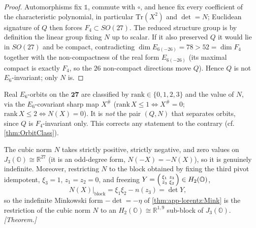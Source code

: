 \begin{proof}
Automorphisms fix $\mathbb{1}$, commute with $\circ$, and hence fix every
coefficient of the characteristic polynomial, in particular $\mathrm{Tr}(X^{2})$ and
$\det=N$; Euclidean signature of $Q$ then forces $F_{4}\subset SO(27)$. The reduced
structure group is by definition the linear group fixing $N$ up to scalar. If it also
preserved $Q$ it would lie in $SO(27)$ and be compact, contradicting
$\dim E_{6(-26)}=78>52=\dim F_{4}$ together with the non-compactness of the real form
$E_{6(-26)}$ (its maximal compact is exactly $F_{4}$, so the $26$ non-compact
directions move $Q$). Hence $Q$ is not $E_{6}$-invariant; only $N$ is.
\end{proof}

\begin{remark}
\label{rmk:app-lorentz:orbits}
Real $E_{6}$-orbits on the $\mathbf{27}$ are classified by
$\mathrm{rank}\in\{0,1,2,3\}$ and the value of $N$, via the $E_{6}$-covariant
sharp map $X^{\#}$ ($\mathrm{rank}\,X\le1\Leftrightarrow X^{\#}=0$;
$\mathrm{rank}\,X\le2\Leftrightarrow N(X)=0$). It is \emph{not} the pair $(Q,N)$
that separates orbits, since $Q$ is $F_{4}$-invariant only. This corrects any
statement to the contrary (cf. \autoref{thm:OrbitClass}).
\end{remark}

\begin{theorem}
\label{thm:app-lorentz:indef}
The cubic norm $N$ takes strictly positive, strictly negative, and zero values on
$J_{3}(\mathbb{O})\cong\mathbb{R}^{27}$ (it is an odd-degree form,
$N(-X)=-N(X)$), so it is genuinely indefinite. Moreover, restricting $N$ to the
block obtained by fixing the third pivot idempotent, $\xi_{3}=1$, $z_{1}=z_{2}=0$,
and freezing $Y=\begin{psmallmatrix}\xi_{1}&z_{3}\\ \bar z_{3}&\xi_{2}\end{psmallmatrix}\in H_{2}(\mathbb{O})$,
\begin{equation}
\label{eq:app-lorentz:block}
N(X)\big|_{\mathrm{block}}=\xi_{1}\xi_{2}-n(z_{3})=\det Y,
\end{equation}
so the indefinite Minkowski form $-\det=-\eta$ of \autoref{thm:app-lorentz:Mink} is
the restriction of the cubic norm $N$ to an $H_{2}(\mathbb{O})\cong\mathbb{R}^{1,9}$
sub-block of $J_{3}(\mathbb{O})$. \emph{[Theorem.]}
\end{theorem}


